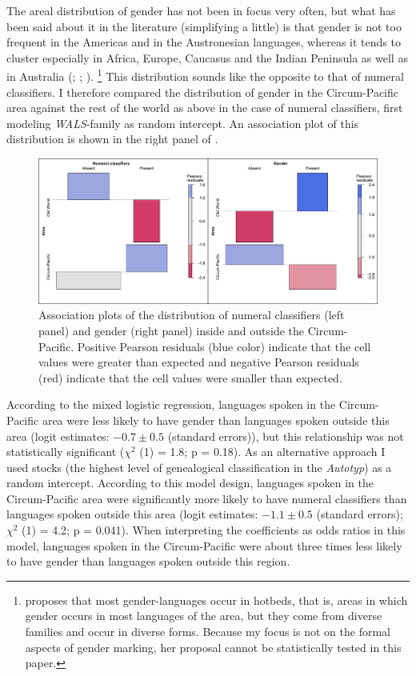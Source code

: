 \documentclass[output=collectionpaper]{langsci/langscibook}
\begin{document}
The areal distribution of gender has not been in focus very often, but what has been said about it in the literature (simplifying a little) is that gender is not too frequent in the Americas and in the Austronesian languages, whereas it tends to cluster especially in Africa, Europe, Caucasus and the Indian Peninsula as well as in Australia (\citealt[1--2]{Corbett1991}; \citealt[130--132]{Nichols1992}; \citealt{Corbett2013}).%
\footnote{\citet[130--132]{Nichols1992} proposes that most gender-languages occur in hotbeds, that is, areas in which gender occurs in most languages of the area, but they come from diverse families and occur in diverse forms. Because my focus is not on the formal aspects of gender marking, her proposal cannot be statistically tested in this paper.} %
This distribution sounds like the opposite to that of numeral classifiers. I therefore compared the distribution of gender in the Circum-Pacific area against the rest of the world as above in the case of numeral classifiers, first modeling \textit{WALS}{}-family as random intercept. An association plot of this distribution is shown in the right panel of .

\begin{figure}
\includegraphics[width=\textwidth]{figures/13/Fig5_assocplot}
\caption{Association plots of the distribution of numeral classifiers (left panel) and gender (right panel) inside and outside the Circum-Pacific. Positive Pearson residuals (blue color) indicate that the cell values were greater than expected and negative Pearson residuals (red) indicate that the cell values were smaller than expected.}
\label{fig:Sinne:5}
\end{figure}

According to the mixed logistic regression, languages spoken in the Circum-Pacific area were less likely to have gender than languages spoken outside this area (logit estimates: $-0.7 \pm 0.5$ (standard errors)), but this relationship was not statistically significant ($\chi^2$ (1) = 1.8; p = 0.18). As an alternative approach I used stocks (the highest level of genealogical classification in the \textit{Autotyp}) as a random intercept. According to this model design, languages spoken in the Circum-Pacific area were significantly more likely to have numeral classifiers than languages spoken outside this area (logit estimates: $-1.1 \pm 0.5$ (standard errors); $\chi^2$ (1) = 4.2; p = 0.041). When interpreting the coefficients as odds ratios in this model, languages spoken in the Circum-Pacific were about three times less likely to have gender than languages spoken outside this region.
\end{document}
